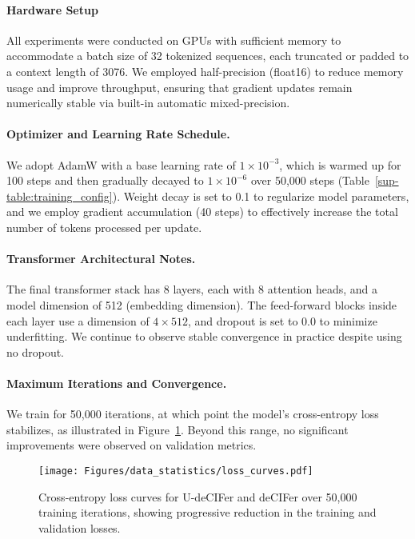 \paragraph{Hardware Setup} All experiments were conducted on GPUs with sufficient memory to accommodate a batch size of 32 tokenized sequences, each truncated or padded to a context length of 3076. We employed half-precision (float16) to reduce memory usage and improve throughput, ensuring that gradient updates remain numerically stable via built-in automatic mixed-precision.

\paragraph{Optimizer and Learning Rate Schedule.} We adopt AdamW with a base learning rate of $1\times10^{-3}$, which is warmed up for 100 steps and then gradually decayed to $1\times10^{-6}$ over 50,000 steps (Table~\ref{sup-table:training_config}). Weight decay is set to 0.1 to regularize model parameters, and we employ gradient accumulation (40 steps) to effectively increase the total number of tokens processed per update.

\paragraph{Transformer Architectural Notes.} The final transformer stack has 8 layers, each with 8 attention heads, and a model dimension of 512 (embedding dimension). The feed-forward blocks inside each layer use a dimension of $4\times512$, and dropout is set to 0.0 to minimize underfitting. We continue to observe stable convergence in practice despite using no dropout.

\paragraph{Maximum Iterations and Convergence.} We train for 50,000 iterations, at which point the model’s cross-entropy loss stabilizes, as illustrated in Figure~\ref{sup-fig:losscurves}. Beyond this range, no significant improvements were observed on validation metrics.

\begin{figure}[t!]
\vskip 0.2in
\begin{center}
\centerline{\texttt{[image: Figures/data\_statistics/loss\_curves.pdf]}}
\caption{Cross-entropy loss curves for U-deCIFer and deCIFer over 50,000 training iterations, showing progressive reduction in the training and validation losses.}
\label{sup-fig:losscurves}
\end{center}
\vskip -0.2in
\end{figure}

